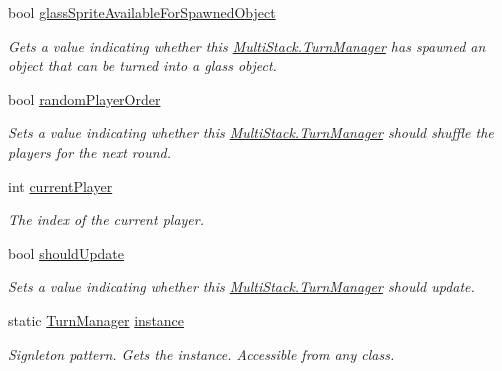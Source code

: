 \begin{DoxyCompactItemize}
bool \hyperlink{class_multi_stack_1_1_turn_manager_a2e2e26f02fda080730d6bd6c5e837e72}{glass\+Sprite\+Available\+For\+Spawned\+Object}
\begin{DoxyCompactList}\small\item\em Gets a value indicating whether this \hyperlink{class_multi_stack_1_1_turn_manager}{Multi\+Stack.\+Turn\+Manager} has spawned an object that can be turned into a glass object. \end{DoxyCompactList}\item 
bool \hyperlink{class_multi_stack_1_1_turn_manager_afbc6bb1a22b590b63ec2b7b496598352}{random\+Player\+Order}
\begin{DoxyCompactList}\small\item\em Sets a value indicating whether this \hyperlink{class_multi_stack_1_1_turn_manager}{Multi\+Stack.\+Turn\+Manager} should shuffle the players for the next round. \end{DoxyCompactList}\item 
int \hyperlink{class_multi_stack_1_1_turn_manager_a308c362d6c9ad9c8ca5f2e039ca76f90}{current\+Player}
\begin{DoxyCompactList}\small\item\em The index of the current player. \end{DoxyCompactList}\item 
bool \hyperlink{class_multi_stack_1_1_turn_manager_a623b9a24f294fbbaa819e9149f9f0135}{should\+Update}
\begin{DoxyCompactList}\small\item\em Sets a value indicating whether this \hyperlink{class_multi_stack_1_1_turn_manager}{Multi\+Stack.\+Turn\+Manager} should update. \end{DoxyCompactList}\item 
static \hyperlink{class_multi_stack_1_1_turn_manager}{Turn\+Manager} \hyperlink{class_multi_stack_1_1_turn_manager_a7da3b19311001850c30860447304a5b4}{instance}
\begin{DoxyCompactList}\small\item\em Signleton pattern. Gets the instance. Accessible from any class. \end{DoxyCompactList}\end{DoxyCompactItemize}


